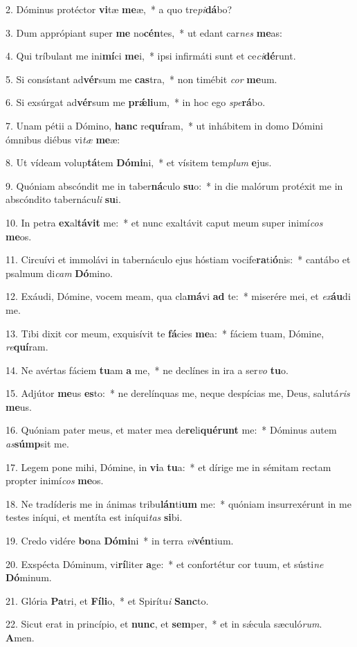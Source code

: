 2. Dóminus protéctor \textbf{vi}tæ \textbf{me}æ,~*  a quo tre\textit{pi}\textbf{dá}bo?\

3. Dum apprópiant super \textbf{me} no\textbf{cén}tes,~*  ut edant car\textit{nes} \textbf{me}as:\

4. Qui tríbulant me ini\textbf{mí}ci \textbf{me}i,~*  ipsi infirmáti sunt et ce\textit{ci}\textbf{dé}runt.\

5. Si consístant ad\textbf{vér}sum me \textbf{cas}tra,~*  non timébit \textit{cor} \textbf{me}um.\

6. Si exsúrgat ad\textbf{vér}sum me \textbf{prǽ}\textbf{li}um,~*  in hoc ego \textit{spe}\textbf{rá}bo.\

7. Unam pétii a Dómino, \textbf{hanc} re\textbf{quí}ram,~*  ut inhábitem in domo Dómini ómnibus diébus vi\textit{tæ} \textbf{me}æ:\

8. Ut vídeam volup\textbf{tá}tem \textbf{Dó}\textbf{mi}ni,~*  et vísitem tem\textit{plum} \textbf{e}jus.\

9. Quóniam abscóndit me in taber\textbf{ná}culo \textbf{su}o:~*  in die malórum protéxit me in abscóndito tabernácu\textit{li} \textbf{su}i.\

10. In petra \textbf{ex}al\textbf{tá}\textbf{vit} me:~*  et nunc exaltávit caput meum super inimí\textit{cos} \textbf{me}os.\

11. Circuívi et immolávi in tabernáculo ejus hóstiam vocife\textbf{ra}ti\textbf{ó}nis:~*  cantábo et psalmum di\textit{cam} \textbf{Dó}mino.\

12. Exáudi, Dómine, vocem meam, qua cla\textbf{má}vi \textbf{ad} te:~*  miserére mei, et \textit{ex}\textbf{áu}di me.\

13. Tibi dixit cor meum, exquisívit te \textbf{fá}cies \textbf{me}a:~*  fáciem tuam, Dómine, \textit{re}\textbf{quí}ram.\

14. Ne avértas fáciem \textbf{tu}am \textbf{a} me,~*  ne declínes in ira a ser\textit{vo} \textbf{tu}o.\

15. Adjútor \textbf{me}us \textbf{es}to:~*  ne derelínquas me, neque despícias me, Deus, salutá\textit{ris} \textbf{me}us.\

16. Quóniam pater meus, et mater mea de\textbf{re}li\textbf{qué}\textbf{runt} me:~*  Dóminus autem \textit{as}\textbf{súmp}sit me.\

17. Legem pone mihi, Dómine, in \textbf{vi}a \textbf{tu}a:~*  et dírige me in sémitam rectam propter inimí\textit{cos} \textbf{me}os.\

18. Ne tradíderis me in ánimas tribu\textbf{lán}ti\textbf{um} me:~*  quóniam insurrexérunt in me testes iníqui, et mentíta est iníqui\textit{tas} \textbf{si}bi.\

19. Credo vidére \textbf{bo}na \textbf{Dó}\textbf{mi}ni~*  in terra \textit{vi}\textbf{vén}tium.\

20. Exspécta Dóminum, vi\textbf{rí}liter \textbf{a}ge:~*  et confortétur cor tuum, et sústi\textit{ne} \textbf{Dó}minum.\

21. Glória \textbf{Pa}tri, et \textbf{Fí}\textbf{li}o,~*  et Spirítu\textit{i} \textbf{Sanc}to.\

22. Sicut erat in princípio, et \textbf{nunc}, et \textbf{sem}per,~*  et in sǽcula sæculó\textit{rum}. \textbf{A}men.\

